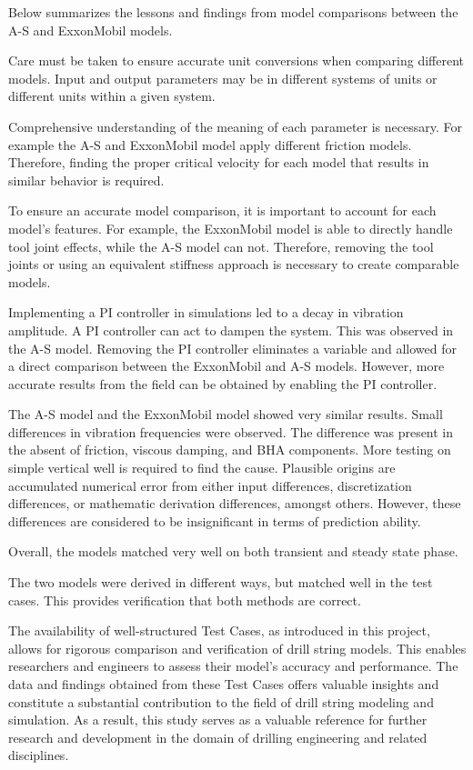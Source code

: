 Below summarizes the lessons and findings from model comparisons between the A-S and ExxonMobil models.
\begin{bulletedlist}
    \item Care must be taken to ensure accurate unit conversions when comparing different models. Input and output parameters may be in different systems of units or different units within a given system.
    \item Comprehensive understanding of the meaning of each parameter is necessary. For example the A-S and ExxonMobil model apply different friction models. Therefore, finding the proper critical velocity for each model that results in similar behavior is required.
    \item To ensure an accurate model comparison, it is important to account for each model's features. For example, the ExxonMobil model is able to directly handle tool joint effects, while the A-S model can not. Therefore, removing the tool joints or using an equivalent stiffness approach is necessary to create comparable models.
    \item Implementing a PI controller in simulations led to a decay in vibration amplitude. A PI controller can act to dampen the system. This was observed in the A-S model. Removing the PI controller eliminates a variable and allowed for a direct comparison between the ExxonMobil and A-S models. However, more accurate results from the field can be obtained by enabling the PI controller.
    \item The A-S model and the ExxonMobil model showed very similar results. Small differences in vibration frequencies were observed. The difference was present in the absent of friction, viscous damping, and BHA components. More testing on simple vertical well is required to find the cause.  Plausible origins are accumulated numerical error from either input differences, discretization differences, or mathematic derivation differences, amongst others.  However, these differences are considered to be insignificant in terms of prediction ability.
    \item Overall, the models matched very well on both transient and steady state phase.
    \item The two models were derived in different ways, but matched well in the test cases.  This provides verification that both methods are correct.
\end{bulletedlist}

The availability of well-structured Test Cases, as introduced in this project, allows for rigorous comparison and verification of drill string models. This enables researchers and engineers to assess their model's accuracy and performance. The data and findings obtained from these Test Cases offers valuable insights and constitute a substantial contribution to the field of drill string modeling and simulation. As a result, this study serves as a valuable reference for further research and development in the domain of drilling engineering and related disciplines.





